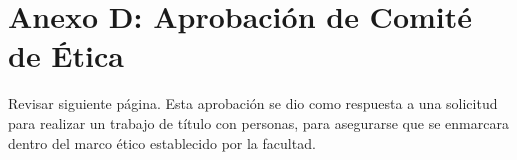 \chapter{Anexo D: Aprobación de Comité de Ética}\label{AnexoD}

Revisar siguiente página. Esta aprobación se dio como respuesta a una solicitud para realizar un trabajo de título con personas, para asegurarse que se enmarcara dentro del marco ético establecido por la facultad.


\begin{figure}[h]
   \centering
\end{figure}

